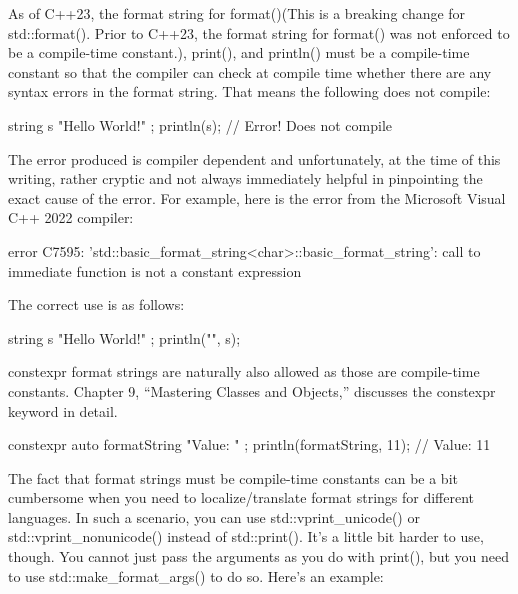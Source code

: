 

As of C++23, the format string for format()(This is a breaking change for std::format(). Prior to C++23, the format string for format() was not enforced to be a compile-time constant.), print(), and println() must be a compile-time constant so that the compiler can check at compile time whether there are any syntax errors in the format string. That means the following does not compile:

\begin{cpp}
string s { "Hello World!" };
println(s); // Error! Does not compile
\end{cpp}

The error produced is compiler dependent and unfortunately, at the time of this writing, rather cryptic and not always immediately helpful in pinpointing the exact cause of the error. For example, here is the error from the Microsoft Visual C++ 2022 compiler:

\begin{shell}
error C7595: 'std::basic_format_string<char>::basic_format_string': call to
immediate function is not a constant expression
\end{shell}

The correct use is as follows:

\begin{cpp}
string s { "Hello World!" };
println("{}", s);
\end{cpp}

constexpr format strings are naturally also allowed as those are compile-time constants. Chapter 9, “Mastering Classes and Objects,” discusses the constexpr keyword in detail.

\begin{cpp}
constexpr auto formatString { "Value: {}" };
println(formatString, 11); // Value: 11
\end{cpp}


The fact that format strings must be compile-time constants can be a bit cumbersome when you need to localize/translate format strings for different languages. In such a scenario, you can use std::vprint\_unicode() or std::vprint\_nonunicode() instead of std::print(). It’s a little bit harder to use, though. You cannot just pass the arguments as you do with print(), but you need to use std::make\_format\_args() to do so. Here’s an example:

